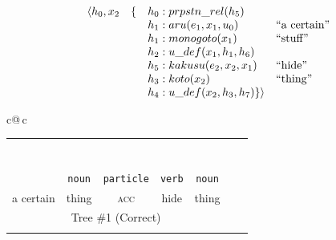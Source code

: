 \documentclass[a4paper,landscape,headrule,footrule,dvips]{foils}
\newcommand{\sa}[2]{\rnode{c#1}{\iz{#2}}}%
\begin{document}
\begin{CJK}{UTF8}{min}
  \setlength{\arraycolsep}{0em}
\[\begin{array}[t]{llll}\setlength{\arraycolsep}{0em}
\langle  h_0,x_2 & \{& h_0:prpstn\_rel(h_5) \\
                  && h_1:aru(e_1,x_1,u_0) & \textnormal{``a certain''}\\
                  && h_1:monogoto(x_1) & \textnormal{``stuff''}\\ 
                  && h_2:u\_def(x_1,h_1,h_6) & \\
                  && h_5:kakusu(e_2,x_2,x_1) & \textnormal{``hide''}\\
                  && h_3:koto(x_2) & \textnormal{``thing''}\\
                  && h_4:u\_def(x_2,h_3,h_7) 
               \} \rangle
\end{array}\]


{\tiny
 \hspace*{-15mm}\begin{tabular}{c@{\,}c} 

  \addtolength{\tabcolsep}{-0.3em}
  \begin{tabular}{ccccccc}
   &\multicolumn{5}{c}{\sa{1}{NP-frag}}  \\[1ex]
   &\multicolumn{5}{c}{\sa{2}{\wl{rel-cl-sbj-gap}}}  \\[1ex]
   &\multicolumn{3}{c}{\sa{3}{hd-complement}} & \sa{4}{N} \\[1ex]
   \multicolumn{3}{c}{\sa{5}{hd-complement}} & \multicolumn{1}{c}{\sa{J}{V}} &
   \\[1ex]
   \multicolumn{2}{c}{\sa{I}{\ul{hd-specifier}}} & & &  & \\[1ex]
   \sa{H}{DET} & \sa{7}{N}      & \sa{8}{CASE-P} &   &  \\[1ex]
   \sa{G}{ある} & \sa{B}{物事} & \sa{C}{を} & \sa{D}{隠す} &  \sa{F}{ 物} \\
   \texttt{\emp{\ul{adnominal}}} & \texttt{noun} & \texttt{particle} & \texttt{verb} & \texttt{noun} \\
   a certain & thing &  \textsc{acc} & hide &  thing \\
   \multicolumn{5}{c}{Tree \#1 (Correct)} \\ \\
  \end{tabular}
  \centering
   
   
   
    
   
   
  

\end{tabular}}
\end{CJK}
\end{document}
